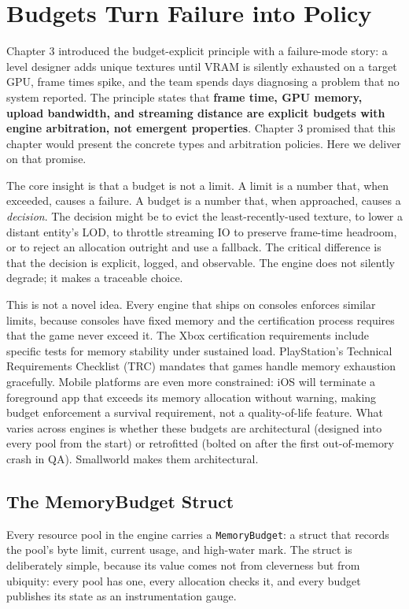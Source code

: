 \documentclass[
  11pt,
  letterpaper,
  DIV=11,
  numbers=noendperiod,
  twoside,
  open=right]{scrreprt}
\begin{document}
\section{Budgets Turn Failure into Policy}\label{sec-budgets}

Chapter 3 introduced the budget-explicit principle with a failure-mode
story: a level designer adds unique textures until VRAM is silently
exhausted on a target GPU, frame times spike, and the team spends days
diagnosing a problem that no system reported. The principle states that
\textbf{frame time, GPU memory, upload bandwidth, and streaming distance
are explicit budgets with engine arbitration, not emergent properties}.
Chapter 3 promised that this chapter would present the concrete types
and arbitration policies. Here we deliver on that promise.

The core insight is that a budget is not a limit. A limit is a number
that, when exceeded, causes a failure. A budget is a number that, when
approached, causes a \emph{decision}. The decision might be to evict the
least-recently-used texture, to lower a distant entity's LOD, to
throttle streaming IO to preserve frame-time headroom, or to reject an
allocation outright and use a fallback. The critical difference is that
the decision is explicit, logged, and observable. The engine does not
silently degrade; it makes a traceable choice.

This is not a novel idea. Every engine that ships on consoles enforces
similar limits, because consoles have fixed memory and the certification
process requires that the game never exceed it. The Xbox certification
requirements include specific tests for memory stability under sustained
load. PlayStation's Technical Requirements Checklist (TRC) mandates that
games handle memory exhaustion gracefully. Mobile platforms are even
more constrained: iOS will terminate a foreground app that exceeds its
memory allocation without warning, making budget enforcement a survival
requirement, not a quality-of-life feature. What varies across engines
is whether these budgets are architectural (designed into every pool
from the start) or retrofitted (bolted on after the first out-of-memory
crash in QA). Smallworld makes them architectural.

\subsection{The MemoryBudget Struct}\label{the-memorybudget-struct}

Every resource pool in the engine carries a \texttt{MemoryBudget}: a
struct that records the pool's byte limit, current usage, and high-water
mark. The struct is deliberately simple, because its value comes not
from cleverness but from ubiquity: every pool has one, every allocation
checks it, and every budget publishes its state as an instrumentation
gauge.
\end{document}
